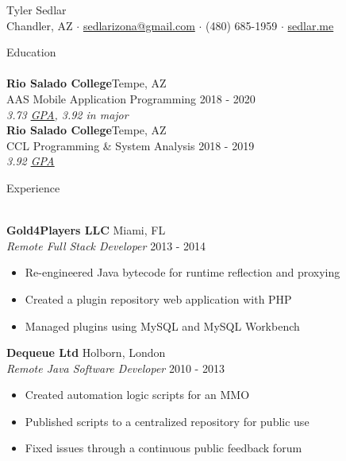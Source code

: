 \documentclass[a4paper]{article}
\newcommand{\lineunder} {
    \vspace*{-8pt} \\
    \hspace*{-18pt} \hrulefill \\
}
\newcommand{\header} [1] {
    {\hspace*{-18pt}\vspace*{6pt} {#1}}
    \vspace*{-6pt} \lineunder
}
\begin{document}
\vspace*{-40pt}
\setul{}{0.25pt}

\vspace*{-10pt}
\begin{center}
	{\Huge {Tyler Sedlar}}\\
	Chandler, AZ $\cdot$ \href{mailto:sedlarizona@gmail.com}{sedlarizona@gmail.com} $\cdot$ (480) 685-1959 $\cdot$ \href{https://sedlar.me/}{sedlar.me}\\
\end{center}

\header{Education}
\textbf{Rio Salado College}\hfill Tempe, AZ\\
AAS Mobile Application Programming \hfill 2018 - 2020\\
\textit{3.73 \href{https://docs.google.com/spreadsheets/d/143DmVdsyjRVbH1ftcySxflvuNjioncAvJpj0vFbzpA8/edit?usp=sharing}{\ul{GPA}}, 3.92 in major}\\
\vspace{2mm}
\textbf{Rio Salado College}\hfill Tempe, AZ\\
CCL Programming \& System Analysis \hfill 2018 - 2019\\
\textit{3.92 \href{https://docs.google.com/spreadsheets/d/143DmVdsyjRVbH1ftcySxflvuNjioncAvJpj0vFbzpA8/edit?usp=sharing}{\ul{GPA}}}\\
\vspace{2mm}

\header{Experience}
\vspace{1mm}

\textbf{Gold4Players LLC} \hfill Miami, FL\\
\textit{Remote Full Stack Developer} \hfill 2013 - 2014\\
\vspace{-1mm}
\begin{itemize} \itemsep 1pt
	\item Re-engineered Java bytecode for runtime reflection and proxying
	\item Created a plugin repository web application with PHP
	\item Managed plugins using MySQL and MySQL Workbench
\end{itemize}
\textbf{Dequeue Ltd} \hfill Holborn, London\\
\textit{Remote Java Software Developer} \hfill 2010 - 2013\\
\vspace{-1mm}
\begin{itemize} \itemsep 1pt
    \item Created automation logic scripts for an MMO
	\item Published scripts to a centralized repository for public use
	\item Fixed issues through a continuous public feedback forum
\end{itemize}
\end{document}

